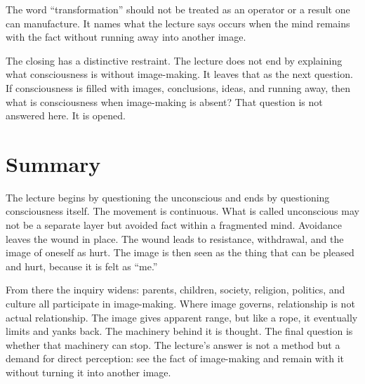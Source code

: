 The word ``transformation'' should not be treated as an operator or a result one can manufacture. It names what the lecture says occurs when the mind remains with the fact without running away into another image.

\begin{figure}
\centering
{}
\end{figure}

The closing has a distinctive restraint. The lecture does not end by explaining what consciousness is without image-making. It leaves that as the next question. If consciousness is filled with images, conclusions, ideas, and running away, then what is consciousness when image-making is absent? That question is not answered here. It is opened.

\section{Summary}

The lecture begins by questioning the unconscious and ends by questioning consciousness itself. The movement is continuous. What is called unconscious may not be a separate layer but avoided fact within a fragmented mind. Avoidance leaves the wound in place. The wound leads to resistance, withdrawal, and the image of oneself as hurt. The image is then seen as the thing that can be pleased and hurt, because it is felt as ``me.''

From there the inquiry widens: parents, children, society, religion, politics, and culture all participate in image-making. Where image governs, relationship is not actual relationship. The image gives apparent range, but like a rope, it eventually limits and yanks back. The machinery behind it is thought. The final question is whether that machinery can stop. The lecture's answer is not a method but a demand for direct perception: see the fact of image-making and remain with it without turning it into another image.